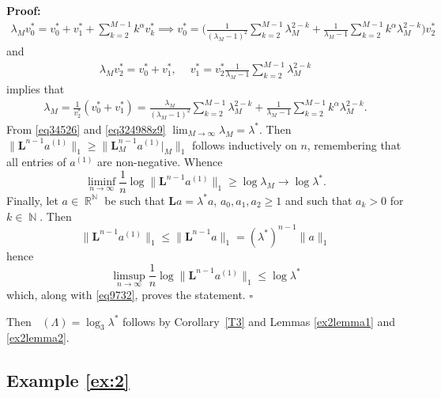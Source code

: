 \documentclass[a4paper, 11pt]{article}
\newenvironment{Proof}{\noindent \textbf{Proof:}}{\hfill$\square$\\}
\DeclareMathOperator{\N}{\mathbb{N}}
\DeclareMathOperator{\R}{\mathbb{R}}
\DeclareMathOperator{\dH}{\dim_{\mathrm{H}}}
\numberwithin{equation}{section}
\theoremstyle{plain}
\theoremstyle{remark}
\theoremstyle{definition}
\begin{document}
\begin{Proof}
\begin{align*}
\lambda_M v_0^* = v^*_0 + v^*_1 + \sum_{k=2}^{M-1} k^\alpha v^*_k \implies  v^*_0 = \Big(\frac{1}{(\lambda_M-1)^2}\sum_{k=2}^{M-1} \lambda_M^{2-k} + \frac{1}{\lambda_M-1}\sum_{k=2}^{M-1} k^\alpha \lambda_M^{2-k}\Big)v^*_2
\end{align*}
and
\begin{equation*}\begin{aligned}
\lambda_M v^*_2 = v^*_0 + v^*_1, \quad \ v^*_1 = v^*_2\frac{1}{\lambda_M-1}\sum_{k=2}^{M-1} \lambda_M^{2-k}
\end{aligned}\end{equation*}
implies that
\begin{equation}\begin{aligned} \label{eq324988z9}
\lambda_M = \frac{1}{v^*_2}(v^*_0 + v^*_1) = \frac{\lambda_M}{(\lambda_M-1)^2}\sum_{k=2}^{M-1} \lambda_M^{2-k} + \frac{1}{\lambda_M-1}\sum_{k=2}^{M-1} k^\alpha \lambda_M^{2-k}.
\end{aligned}\end{equation}
From \eqref{eq34526} and \eqref{eq324988z9} $\lim_{M \to \infty}\lambda_M = \lambda^*$. Then $\|\mathbf{L}^{n-1}a^{(1)} \|_1 \geq \|\mathbf{L}_M^{n-1}a^{(1)}|_M \|_1$ follows inductively on $n$, remembering that all entries of $a^{(1)}$ are non-negative. Whence
\begin{equation}\label{eq9732}
\liminf_{n \to \infty}\frac{1}{n} \log \|\mathbf{L}^{n-1}a^{(1)} \|_1 \geq \log \lambda_M \longrightarrow \log \lambda^*.
\end{equation}
Finally, let $a \in \R^{\N}$ be such that $\mathbf{L}a = \lambda^*a$, $a_0,a_1,a_2 \geq 1$ and such that $a_k > 0$ for $k \in \N$. Then
\begin{equation*}
\|\mathbf{L}^{n-1}a^{(1)} \|_1 \leq \|\mathbf{L}^{n-1}a \|_1 = (\lambda^*)^{n-1} \|a \|_1
\end{equation*}
hence
\begin{equation*}
\limsup_{n \to \infty}\frac{1}{n} \log \|\mathbf{L}^{n-1}a^{(1)} \|_1 \leq \log \lambda^*
\end{equation*}
which, along with \eqref{eq9732}, proves the statement.
\end{Proof}

Then $\dH(\Lambda)=\log_3\lambda^*$ follows by Corollary~\ref{T3} and Lemmas \ref{ex2lemma1} and \ref{ex2lemma2}.


\subsection{Example \ref{ex:2}}
\end{document}
